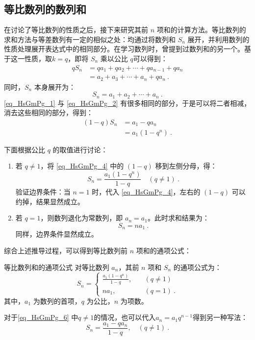\subsection{等比数列的数列和}

在讨论了等比数列的性质之后，接下来研究其前 $n$ 项和的计算方法。等比数列的求和方法与等差数列有一定的相似之处：均通过将数列和 $S_n$ 展开，并利用数列的性质处理展开表达式中的相同部分。在学习数列时，曾提到过数列和的另一个。基于这一性质，取$k=q$，即将 $S_n$ 乘以公比 $q$可以得到：
\begin{equation}\label{eq_HsGmPg_1}
\begin{aligned}
qS_n &= qa_1 + qa_2 + \cdots + qa_{n-1} + qa_n\\
&= a_2 + a_3 + \cdots + a_n + qa_n~.
\end{aligned}
\end{equation}
同时，$S_n$ 本身展开为：
\begin{equation}\label{eq_HsGmPg_2}
S_n = a_1 + a_2 + \cdots + a_n~.
\end{equation}
\autoref{eq_HsGmPg_1} 与 \autoref{eq_HsGmPg_2} 有很多相同的部分，于是可以将二者相减，消去这些相同的部分，得到：
\begin{equation}\label{eq_HsGmPg_4}
\begin{aligned}
(1 - q)S_n &= a_1 - qa_n \\
&= a_1(1 - q^n)~.
\end{aligned}
\end{equation}

下面根据公比 $q$ 的取值进行讨论：
\begin{enumerate}
\item 若 $q \neq 1$，将 \autoref{eq_HsGmPg_4} 中的 $(1 - q)$ 移到左侧分母，得：
\begin{equation}
S_n = \frac{a_1(1 - q^n)}{1 - q} \quad (q \neq 1)~.
\end{equation}
验证边界条件：当 $n = 1$ 时，代入 \autoref{eq_HsGmPg_4}，左右的 $(1 - q)$ 可以约掉，结果显然成立。
\item 若 $q = 1$，则数列退化为常数列，即 $a_n = a_1$。此时求和结果为：
\begin{equation}
S_n = na_1~.
\end{equation}
同样，边界条件显然成立。
\end{enumerate}

综合上述推导过程，可以得到等比数列前 $n$ 项和的通项公式：
\begin{corollary}{等比数列和的通项公式}
对等比数列 ${a_n}$，其前 $n$ 项和 $S_n$ 的通项公式为：
\begin{equation}\label{eq_HsGmPg_6}
S_n = \begin{cases}
\displaystyle\frac{a_1(1 - q^n)}{1 - q}, & \quad (q \neq 1) \\
na_1, & \quad (q = 1)~.
\end{cases}
\end{equation}
其中，$a_1$ 为数列的首项，$q$ 为公比，$n$ 为项数。
\end{corollary}
对于\autoref{eq_HsGmPg_6} 中$q\neq1$的情况，也可以代入$a_n=a_1q^{n-1}$得到另一种写法：
\begin{equation}
S_n = \frac{a_1 - qa_n}{1 - q}, \quad (q \neq 1) ~.
\end{equation}

